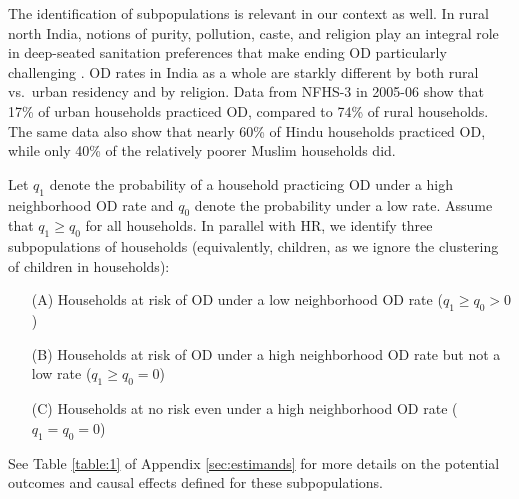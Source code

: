 \documentclass[12pt,a4paper,titlepage]{article}
\begin{document}
The identification of subpopulations is relevant in our context as well. In rural north India, notions of purity, pollution, caste, and religion play an integral role in deep-seated sanitation preferences that make ending OD particularly challenging \citep{squat, san_culture}. OD rates in India as a whole are starkly different by both rural vs.\ urban residency and by religion. Data from NFHS-3 in 2005-06 show that 17\% of urban households practiced OD, compared to 74\% of rural households. The same data also show that nearly 60\% of Hindu households practiced OD, while only 40\% of the relatively poorer Muslim households did.

Let $q_1$ denote the probability of a household practicing OD under a high neighborhood OD rate and $q_0$ denote the probability under a low rate. Assume that $q_1 \geq q_0$ for all households. In parallel with HR, we identify three subpopulations of households (equivalently, children, as we ignore the clustering of children in households):
\begin{itemize}
	\item[(A)] Households at risk of OD under a low neighborhood OD rate ($q_1 \geq q_0 > 0$)
	\item[(B)] Households at risk of OD under a high neighborhood OD rate but not a low rate ($q_1 \geq q_0 = 0$)
	\item[(C)] Households at no risk even under a high neighborhood OD rate ($q_1 = q_0 = 0$)
\end{itemize}
See Table \ref{table:1} of Appendix \ref{sec:estimands} for more details on the potential outcomes and causal effects defined for these subpopulations.
\end{document}
